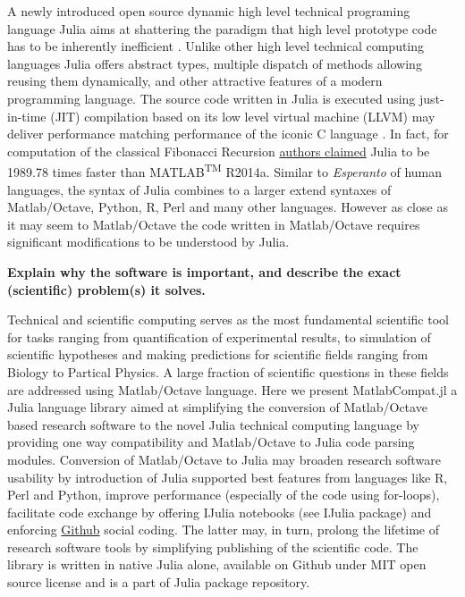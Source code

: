A newly introduced open source dynamic high level technical programing language Julia aims at shattering the paradigm that high level prototype code has to be inherently inefficient \cite{bezanson2012julia, bezanson2014julia}.  Unlike other high level technical computing languages Julia offers abstract types, multiple dispatch of methods allowing reusing them dynamically, and other attractive features of a modern programming language. The source code written in Julia is executed using just-in-time (JIT) compilation based on its low level virtual machine (LLVM) may deliver performance matching performance of the iconic C language \cite{bezanson2012julia, bezanson2014julia}. In fact, for computation of the classical Fibonacci Recursion \href{http://julialang.org/benchmarks/}{authors claimed} Julia to be 1989.78 times faster than MATLAB\textsuperscript{TM} R2014a. Similar to \textit{Esperanto} of human languages, the syntax of Julia combines to a larger extend syntaxes of Matlab/Octave, Python, R, Perl and many other languages. However as close as it may seem to Matlab/Octave the code written in Matlab/Octave requires significant modifications to be understood by Julia.

\textbf{Explain why the software is important, and describe the exact (scientific) problem(s) it solves.}

Technical and scientific computing serves as the most fundamental scientific tool for tasks ranging from quantification of experimental results, to simulation of scientific hypotheses and making predictions for scientific fields ranging from Biology to Partical Physics. A large fraction of scientific questions in these fields are addressed using Matlab/Octave language. Here we present MatlabCompat.jl a Julia language library aimed at simplifying the conversion of Matlab/Octave based research software to the novel Julia technical computing language by providing one way compatibility and Matlab/Octave to Julia code parsing modules. Conversion of Matlab/Octave to Julia may broaden research software usability by introduction of Julia supported best features from languages like R, Perl and Python, improve performance (especially of the code using for-loops), facilitate code exchange by offering IJulia notebooks (see IJulia package) and enforcing \href{http://github.com}{Github} social coding. The latter may, in turn, prolong the lifetime of research software tools by simplifying publishing of the scientific code. The library is written in native Julia alone, available on Github under MIT open source license and is a part of Julia package repository.

